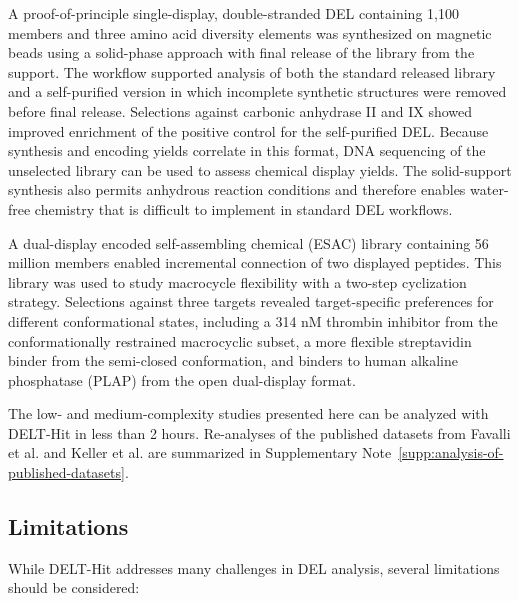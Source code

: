 A proof-of-principle single-display, double-stranded DEL containing 1,100 members and three amino acid diversity elements was synthesized on magnetic beads using a solid-phase approach with final release of the library from the support. The workflow supported analysis of both the standard released library and a self-purified version in which incomplete synthetic structures were removed before final release. Selections against carbonic anhydrase II and IX showed improved enrichment of the positive control for the self-purified DEL. Because synthesis and encoding yields correlate in this format, DNA sequencing of the unselected library can be used to assess chemical display yields. The solid-support synthesis also permits anhydrous reaction conditions and therefore enables water-free chemistry that is difficult to implement in standard DEL workflows\cite{keller_highlypurednaencoded_2024}.

A dual-display encoded self-assembling chemical (ESAC) library containing 56 million members enabled incremental connection of two displayed peptides. This library was used to study macrocycle flexibility with a two-step cyclization strategy. Selections against three targets revealed target-specific preferences for different conformational states, including a 314 nM thrombin inhibitor from the conformationally restrained macrocyclic subset, a more flexible streptavidin binder from the semi-closed conformation, and binders to human alkaline phosphatase (PLAP) from the open dual-display format\cite{petrov_flexibilitytuningdualdisplaydnaencoded_2025}.

The low- and medium-complexity studies presented here can be analyzed with DELT-Hit in less than 2 hours. Re-analyses of the published datasets from Favalli et al. and Keller et al. are summarized in Supplementary Note~\ref{supp:analysis-of-published-datasets}.

\subsection{Limitations}
While DELT-Hit addresses many challenges in DEL analysis, several limitations should be considered:

